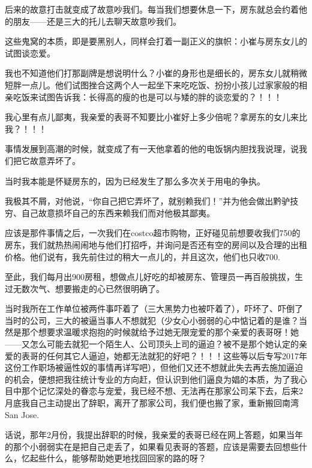 \documentclass[9pt, b5paper]{article}
\begin{document}
后来的故意打击就变成了故意吵我们。每当我们想要休息一下，房东就总会约着他的朋友——还是三大的托儿去聊天故意吵我们。

这些鬼窝的本质，即是要黑别人，同样会打着一副正义的旗帜：小崔与房东女儿的试图谈恋爱。

我也不知道他们打那副牌是想说明什么？小崔的身形也是细长的，房东女儿就稍微短胖一点儿。他们试图挫合这两个人一起坐下来吃吃饭、扮扮小孩儿过家家般的相亲吃饭来试图告诉我：长得高的瘦的也是可以与矮的胖的谈恋爱的？！！！

我心里有点儿鄙夷，我亲爱的表哥不知要比小崔好上多少倍呢？拿房东的女儿来比我？！！！

事情发展到高潮的时候，就变成了有一天他拿着的他的电饭锅内胆找我说理，说我们把它故意弄坏了。

当时我本能是怀疑房东的，因为已经发生了那么多次关于用电的争执。

我极其不屑，对他说，“你自己把它弄坏了，就别赖我们！”并为他会做出黔驴技穷、自己故意损坏自己的东西来赖我们而对他极其鄙夷。

应该是那件事情之后，一次我们在costco超市购物，正好碰见前想要收我们750的房东，我们就热热闹闹地与他们打招呼，并询问是否还有空的房间以及合理的出租价格。他们说有，我先前住过的稍大一点儿的，并且这次，他们也只收700.

至此，我们每月出900房租，想做点儿好吃的却被房东、管理员一再百般挑拔，生过无数次气、想要搬走的心已然很明确了。

当时我所在工作单位被两件事吓着了（三大黑势力也被吓着了），吓坏了、吓倒了当时的公司，三大的被逼当事人不想就犯（少女心小弱弱的心中惦记着的是谁？当然是那个想要求温暖求抱抱的时候就给予过她无限宠爱的那个亲爱的表哥呀！她——又怎么可能去就犯一个陌生人、公司顶头上司的逼迫？被不是那个她认定的亲爱的表哥的任何其它人逼迫，她都无法就犯的好吧？！！！这些等以后专写2017年这份工作职场被逼性奴的事情再详写吧），但他们又还不想就此失去再去施加逼迫的机会，便想把我往统计专业的方向赶，但认识到他们逼良为娼的本质，为了我心目中那个记忆深处的眷恋与宠爱，我已经不想、无法再在那家公司呆下去，后来2月底我自己主动提出了辞职，离开了那家公司，我们便也搬了家，重新搬回南湾San Jose.

话说，那年2月份，我提出辞职的时候，我亲爱的表哥已经在网上答题，如果当年的那个小弱弱实在是把自己走丢了，如果看见表哥的答题，应该是需要去回想些什么，忆起些什么，能够帮助她更地找回回家的路的呀？
\end{document}

